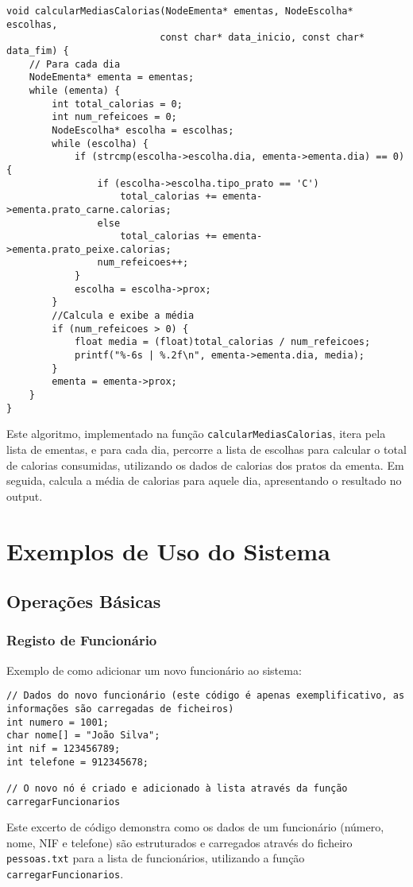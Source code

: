 \documentclass[a4paper,12pt]{report}
\begin{document}
\begin{lstlisting}[caption={Algoritmo de cálculo de médias},label=lst:medias]
void calcularMediasCalorias(NodeEmenta* ementas, NodeEscolha* escolhas,
                           const char* data_inicio, const char* data_fim) {
    // Para cada dia
    NodeEmenta* ementa = ementas;
    while (ementa) {
        int total_calorias = 0;
        int num_refeicoes = 0;
        NodeEscolha* escolha = escolhas;
        while (escolha) {
            if (strcmp(escolha->escolha.dia, ementa->ementa.dia) == 0) {
                if (escolha->escolha.tipo_prato == 'C')
                    total_calorias += ementa->ementa.prato_carne.calorias;
                else
                    total_calorias += ementa->ementa.prato_peixe.calorias;
                num_refeicoes++;
            }
            escolha = escolha->prox;
        }
        //Calcula e exibe a média
        if (num_refeicoes > 0) {
            float media = (float)total_calorias / num_refeicoes;
            printf("%-6s | %.2f\n", ementa->ementa.dia, media);
        }
        ementa = ementa->prox;
    }
}
\end{lstlisting}
Este algoritmo, implementado na função \texttt{calcularMediasCalorias}, itera pela lista de ementas, e para cada dia, percorre a lista de escolhas para calcular o total de calorias consumidas, utilizando os dados de calorias dos pratos da ementa. Em seguida, calcula a média de calorias para aquele dia, apresentando o resultado no output.

\chapter{Exemplos de Uso do Sistema}
\section{Operações Básicas}
\subsection{Registo de Funcionário}
Exemplo de como adicionar um novo funcionário ao sistema:

\begin{lstlisting}[caption={Exemplo de Registo de funcionário},label=lst:exemplo_registo_func]
// Dados do novo funcionário (este código é apenas exemplificativo, as informações são carregadas de ficheiros)
int numero = 1001;
char nome[] = "João Silva";
int nif = 123456789;
int telefone = 912345678;

// O novo nó é criado e adicionado à lista através da função carregarFuncionarios
\end{lstlisting}
Este excerto de código demonstra como os dados de um funcionário (número, nome, NIF e telefone) são estruturados e carregados através do ficheiro \texttt{pessoas.txt} para a lista de funcionários, utilizando a função \texttt{carregarFuncionarios}.
\end{document}
